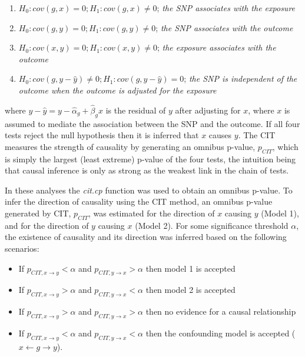 \documentclass[]{article}
\providecommand{\tightlist}{%
  \setlength{\itemsep}{0pt}\setlength{\parskip}{0pt}}
\begin{document}
\begin{enumerate}
\def\labelenumi{\arabic{enumi}.}
\tightlist
\item
  \(H_0: cov(g, x) = 0; H_1: cov(g, x) \neq 0\); \emph{the SNP
  associates with the exposure}
\item
  \(H_0: cov(g, y) = 0; H_1: cov(g, y) \neq 0\); \emph{the SNP
  associates with the outcome}
\item
  \(H_0: cov(x, y) = 0; H_1: cov(x, y) \neq 0\); \emph{the exposure
  associates with the outcome}
\item
  \(H_0: cov(g, y - \hat{y}) \neq 0; H_1: cov(g, y - \hat{y}) = 0\);
  \emph{the SNP is independent of the outcome when the outcome is
  adjusted for the exposure}
\end{enumerate}

where \(y - \hat{y} = y - \hat{\alpha}_g + \hat{\beta}_g x\) is the
residual of \(y\) after adjusting for \(x\), where \(x\) is assumed to
mediate the association between the SNP and the outcome. If all four
tests reject the null hypothesis then it is inferred that \(x\) causes
\(y\). The CIT measures the strength of causality by generating an
omnibus p-value, \(p_{CIT}\), which is simply the largest (least
extreme) p-value of the four tests, the intuition being that causal
inference is only as strong as the weakest link in the chain of tests.

In these analyses the \emph{cit.cp} function was used to obtain an
omnibus p-value. To infer the direction of causality using the CIT
method, an omnibus p-value generated by CIT, \(p_{CIT}\), was estimated
for the direction of \(x\) causing \(y\) (Model 1), and for the
direction of \(y\) causing \(x\) (Model 2). For some significance
threshold \(\alpha\), the existence of causality and its direction was
inferred based on the following scenarios:

\begin{itemize}
\tightlist
\item
  If \(p_{CIT, x \rightarrow y} < \alpha\) and
  \(p_{CIT, y \rightarrow x} > \alpha\) then model 1 is accepted
\item
  If \(p_{CIT, x \rightarrow y} > \alpha\) and
  \(p_{CIT, y \rightarrow x} < \alpha\) then model 2 is accepted
\item
  If \(p_{CIT, x \rightarrow y} > \alpha\) and
  \(p_{CIT, y \rightarrow x} > \alpha\) then no evidence for a causal
  relationship
\item
  If \(p_{CIT, x \rightarrow y} < \alpha\) and
  \(p_{CIT, y \rightarrow x} < \alpha\) then the confounding model is
  accepted (\(x \leftarrow g \rightarrow y\)).
\end{itemize}
\end{document}
